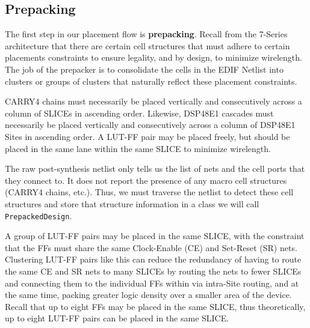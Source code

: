 \documentclass{article}
\begin{document}
    \begin{multicols}{2}

    \subsection{Prepacking}
        \label{subsec:prepacking}


        The first step in our placement flow is \textbf{prepacking}. 
        Recall from the 7-Series architecture that there are certain cell structures that must adhere to certain placements constraints to ensure legality, and by design, to minimize wirelength. 
        The job of the prepacker is to consolidate the cells in the EDIF Netlist into clusters or groups of clusters that naturally reflect these placement constraints. 

        CARRY4 chains must necessarily be placed vertically and consecutively across a column of SLICEs in ascending order. 
        Likewise, DSP48E1 cascades must necessarily be placed vertically and consecutively across a column of DSP48E1 Sites in ascending order. 
        A LUT-FF pair may be placed freely, but should be placed in the same lane within the same SLICE to minimize wirelength.

        The raw post-synthesis netlist only tells us the list of nets and the cell ports that they connect to. 
        It does not report the presence of any macro cell structures (CARRY4 chains, etc.). 
        Thus, we must traverse the netlist to detect these cell structures and store that structure information in a class we will call \texttt{PrepackedDesign}.

        A group of LUT-FF pairs may be placed in the same SLICE, with the constraint that the FFs must share the same Clock-Enable (CE) and Set-Reset (SR) nets.
        Clustering LUT-FF pairs like this can reduce the redundancy of having to route the same CE and SR nets to many SLICEs by routing the nets to fewer SLICEs and connecting them to the individual FFs within via intra-Site routing, and at the same time, packing greater logic density over a smaller area of the device. 
        Recall that up to eight FFs may be placed in the same SLICE, thus theoretically, up to eight LUT-FF pairs can be placed in the same SLICE. 



\end{multicols}
\end{document}
